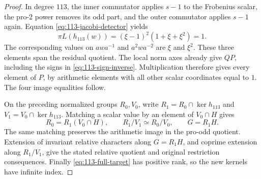 \begin{proof}
In degree \(113\), the inner commutator applies \(s-1\)
to the Frobenius scalar, the pro-\(2\) power removes its
odd part, and the outer commutator applies \(s-1\) again.
Equation \eqref{eq:113-jacobi-detector} yields
\[
 \pi L(h_{113}(w))
    =(\xi-1)^2(1+\xi+\xi^2)=1.
\]
The corresponding values on \(awa^{-1}\) and
\(a^2wa^{-2}\) are \(\xi\) and \(\xi^2\).
These three elements span the residual quotient.
The local norm axes already give \(QP\), including the
signs in \eqref{eq:113-sign-inverse}. Multiplication
therefore gives every element of \(P\), by arithmetic
elements with all other scalar coordinates equal to \(1\).
The four image equalities follow.

On the preceding normalized groups \(R_0,V_0\), write
\(R_1=R_0\cap\ker h_{113}\) and
\(V_1=V_0\cap\ker h_{113}\). Matching a scalar value
by an element of \(V_0\cap H\) gives
\[
 R_0=R_1(V_0\cap H),\qquad
 R_1/V_1\simeq R_0/V_0,\qquad G=R_1H.
\]
The same matching preserves the arithmetic image in the
pro-odd quotient. Extension of invariant relative
characters along \(G=R_1H\), and coprime extension along
\(R_1/V_1\), give the stated relative quotient and original
restriction consequences. Finally
\eqref{eq:113-full-target} has positive rank, so the
new kernels have infinite index.
\end{proof}
